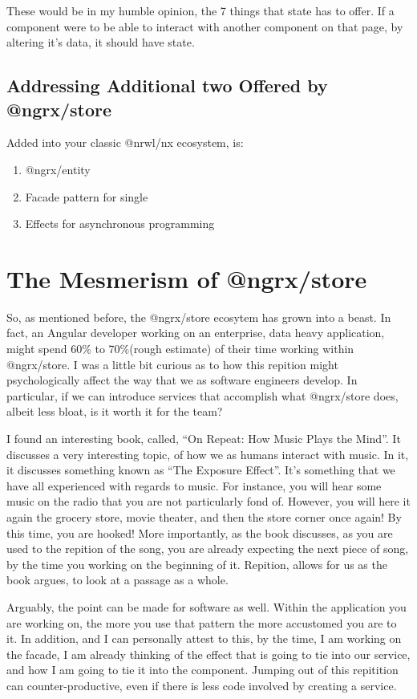 These would be in my humble opinion, the 7 things that state has to offer. If a
component were to be able to interact with another component on that page, by
altering it's data, it should have state.

\subsection{ Addressing Additional two Offered by @ngrx/store }
Added into your classic @nrwl/nx ecosystem, is:
\begin{enumerate}
  \item @ngrx/entity
  \item Facade pattern for single
  \item Effects for asynchronous programming
\end{enumerate}

\section{The Mesmerism of @ngrx/store}

So, as mentioned before, the @ngrx/store ecosytem has grown into a beast. In
fact, an Angular developer working on an enterprise, data heavy application,
might spend 60\% to 70\%(rough estimate) of their time working within
@ngrx/store. I was a little bit curious as to how this repition might
psychologically affect the way that we as software engineers develop. In
particular, if we can introduce services that accomplish what @ngrx/store does,
albeit less bloat, is it worth it for the team?

I found an interesting book, called, ``On Repeat: How Music Plays the Mind''. It
discusses a very interesting topic, of how we as humans interact with music. In
it, it discusses something known as ``The Exposure Effect''. It's something that
we have all experienced with regards to music. For instance, you will hear some
music on the radio that you are not particularly fond of. However, you will here
it again the grocery store, movie theater, and then the store corner once again!
By this time, you are hooked! More importantly, as the book discusses, as you
are used to the repition of the song, you are already expecting the next piece
of song, by the time you working on the beginning of it. Repition, allows for us
as the book argues, to look at a passage as a whole.

Arguably, the point can be made for software as well. Within the application you
are working on, the more you use that pattern the more accustomed you are to it.
In addition, and I can personally attest to this, by the time, I am working on
the facade, I am already thinking of the effect that is going to tie into our
service, and how I am going to tie it into the component. Jumping out of this
repitition can counter-productive, even if there is less code involved by
creating a service.

